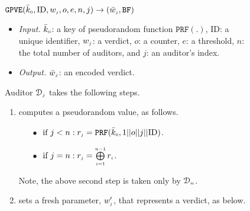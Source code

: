 \begin{figure}[!htp]
\setlength{\fboxsep}{1.5pt}
\begin{center}
    \begin{tcolorbox}[enhanced,width=83mm, height=97mm, left=0mm,
    drop fuzzy shadow southwest,
    colframe=black,colback=white]
    {\small{
   \vspace{-2.7mm}

\underline{$\mathtt{GPVE}(\bar{k}_{\scriptscriptstyle 0}, \text{ID},  w_{\scriptscriptstyle j}, o, e, n,  j)\rightarrow  (\bar{  w}_{\scriptscriptstyle j}, \mathtt{BF})$}\\
%
\vspace{-3mm}
\begin{itemize}[leftmargin=4.2mm]
\item \noindent\textit{Input.} $\bar{k}_{\scriptscriptstyle 0}$: a key of  pseudorandom function $\mathtt{PRF}(.)$, $\text{ID}$: a unique identifier, $ w_{\scriptscriptstyle j}$: a  verdict, $o$: a counter, $e$: a threshold, $n$: the total number of  auditors,  and  $j$: an auditor's index.
%
\item \noindent\textit{Output.} $\bar{  w}_{\scriptscriptstyle j}$:  an  encoded verdict.  
%
\end{itemize}
Auditor $\mathcal{D}_{\scriptscriptstyle j}$ takes the following steps.
\vspace{-1mm}
\begin{enumerate}[leftmargin=5.2mm]
%
\item\label{ZSPA:val-gen} computes a pseudorandom value, as follows. 
%
%
\begin{itemize}
%
\item[$\bullet$]$ \text{ if } j< n: r_{\scriptscriptstyle j}=\mathtt{PRF}(\bar k_{\scriptscriptstyle 0}, 1||o||j||\text{ID})$.\\
%
\vspace{-3mm} 
\item [$\bullet$] $ \text{ if } j=n: r_{\scriptscriptstyle j}= \bigoplus\limits^{\scriptscriptstyle n-1}_{\scriptscriptstyle i=1} r_{\scriptscriptstyle i}$.
%
\end{itemize}
\vspace{-1mm}
Note, the above second step is taken only by $\mathcal{D}_{\scriptscriptstyle n}$.
%
\item  sets a fresh parameter, $w'_{\scriptscriptstyle j}$, that represents a verdict, as below. 
\vspace{-3mm}
%


\end{enumerate}}}
\end{tcolorbox}
\end{center}
\end{figure}
